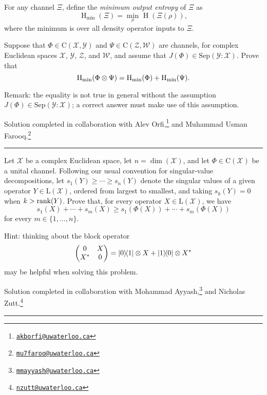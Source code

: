\documentclass[boxes,pages,color=SeaGreen]{homework}
\newcommand{\collab}[1]{\footnote{\href{mailto:#1}{\texttt{#1}}}}
\newcommand{\tinyspace}{\mspace{1mu}}
\renewcommand{\op}[1]{\operatorname{#1}}
\newcommand{\X}{\mathcal{X}}
\newcommand{\Y}{\mathcal{Y}}
\newcommand{\Z}{\mathcal{Z}}
\newcommand{\W}{\mathcal{W}}
\newcommand{\Lin}{\mathrm{L}}
\newcommand{\Channel}{\mathrm{C}}
\newcommand{\Sep}{\mathrm{Sep}}
\begin{document}
\begin{problem}
For any channel $\Xi$, define the \emph{minimum output entropy} of $\Xi$ as
\[
  \op{H}_{\text{min}}(\Xi) = \min_{\rho} \tinyspace \op{H}(\Xi(\rho)),
\]
where the minimum is over all density operator inputs to $\Xi$.

Suppose that $\Phi\in\Channel(\X, \Y)$ and $\Psi\in\Channel(\Z, \W)$ are
channels, for complex Euclidean spaces $\X$, $\Y$, $\Z$, and $\W$, and assume
that $J(\Phi)\in\Sep(\Y \mathbin{:} \X)$.
Prove that
\[
  \op{H}_{\text{min}}(\Phi\otimes\Psi) =
  \op{H}_{\text{min}}(\Phi) + \op{H}_{\textup{min}}(\Psi).
\]

Remark: the equality is not true in general without the assumption
$J(\Phi)\in\Sep(\Y \mathbin{:} \X)$; a correct answer must make use of this
assumption.
\end{problem}

\noindent Solution completed in collaboration with Alev Orfi,\collab{akborfi@uwaterloo.ca} and Muhammad Usman Farooq.\collab{mu7faroo@uwaterloo.ca}

{\noindent\color{SeaGreen!30}\rule{\textwidth}{1.5pt}}

\begin{solution}
\end{solution}

\begin{problem}
Let $\X$ be a complex Euclidean space, let $n = \dim(\X)$, and let
$\Phi\in\Channel(\X)$ be a unital channel.
Following our usual convention for singular-value decompositions, let
$s_1(Y) \geq \cdots \geq s_n(Y)$ denote the singular values of a given
operator $Y\in\Lin(\X)$, ordered from largest to smallest, and taking
$s_k(Y) = 0$ when $k > \rank(Y)$.
Prove that, for every operator $X\in\Lin(\X)$, we have
\[
  s_1(X) + \cdots + s_m(X) \geq s_1(\Phi(X)) + \cdots + s_m(\Phi(X))
\]
for every $m \in \{1,\ldots,n\}$.

Hint: thinking about the block operator
\[
  \mqty(
  0   & X \\
  X^* & 0
  )
  = \ketbra{0}{1} \otimes X + \ketbra{1}{0} \otimes X^*
\]
may be helpful when solving this problem.
\end{problem}

\noindent Solution completed in collaboration with Mohammad Ayyash,\collab{mmayyash@uwaterloo.ca} and Nicholas Zutt.\collab{nzutt@uwaterloo.ca}

{\noindent\color{SeaGreen!30}\rule{\textwidth}{1.5pt}}

\begin{solution}
\end{solution}
\end{document}
